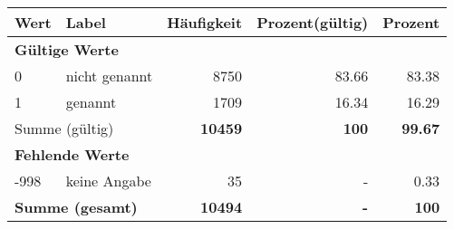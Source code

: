      \begin{longtable}{lXrrr}
     \toprule
     \textbf{Wert} & \textbf{Label} & \textbf{Häufigkeit} & \textbf{Prozent(gültig)} & \textbf{Prozent} \\
     \endhead
     \midrule
     \multicolumn{5}{l}{\textbf{Gültige Werte}}\\

     0 &
     \multicolumn{1}{X}{ nicht genannt   } &


       \num{8750} &
       \num[round-mode=places,round-precision=2]{83,66} &
         \num[round-mode=places,round-precision=2]{83,38} \\

     1 &
     \multicolumn{1}{X}{ genannt   } &


       \num{1709} &
       \num[round-mode=places,round-precision=2]{16,34} &
         \num[round-mode=places,round-precision=2]{16,29} \\
     \midrule
     \multicolumn{2}{l}{Summe (gültig)} &
       \textbf{\num{10459}} &
     \textbf{100} &
       \textbf{\num[round-mode=places,round-precision=2]{99,67}} \\
     \multicolumn{5}{l}{\textbf{Fehlende Werte}}\\
       -998 &
       keine Angabe &
         \num{35} &
        - &
         \num[round-mode=places,round-precision=2]{0,33} \\
     \midrule
     \multicolumn{2}{l}{\textbf{Summe (gesamt)}} &
          \textbf{\num{10494}} &
        \textbf{-} &
        \textbf{100} \\
     \bottomrule
     \end{longtable}
     
